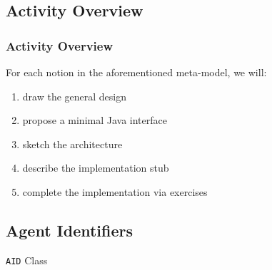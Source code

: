 \documentclass[presentation]{beamer}\mode<presentation>{\usetheme{AMSCesenaPurpleAndGold}}
\begin{document}
\subsection{Activity Overview}

\begin{frame}%
	\frametitle{Activity Overview}

	For each notion in the aforementioned meta-model, we will:
	\vfill
	\begin{enumerate}
		\item draw the general design

		\vfill

		\item propose a minimal Java interface

		\vfill

		\item sketch the architecture

		\vfill

		\item describe the implementation stub

		\vfill

		\item complete the implementation via exercises
	\end{enumerate}

\end{frame}

\subsection{Agent Identifiers}

\begin{frame}{\texttt{AID} Class}

	

\end{frame}
\end{document}
